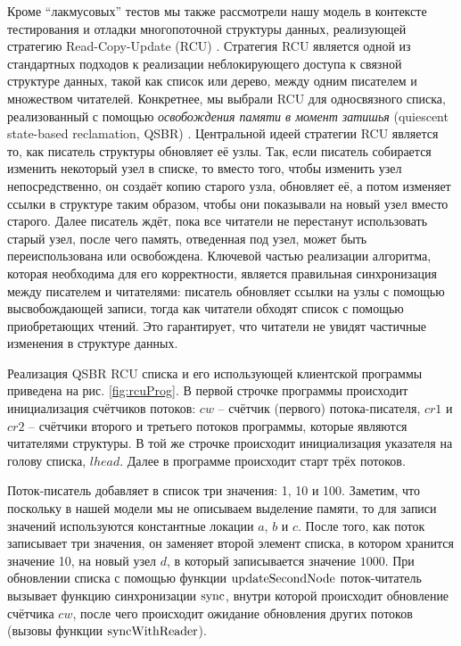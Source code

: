 Кроме ``лакмусовых'' тестов мы также рассмотрели нашу модель в контексте тестирования и отладки
многопоточной структуры данных, реализующей стратегию Read-Copy-Update (RCU) \cite{McKenney-Slingwine:PDCS98,McKenney:PhD}.
Стратегия RCU является одной из стандартных подходов к реализации неблокирующего доступа к
связной структуре данных, такой как список или дерево, между одним писателем и множеством читателей.
Конкретнее, мы выбрали RCU для односвязного списка, реализованный с помощью
\emph{освобождения памяти в момент затишья} (quiescent state-based reclamation, QSBR) \cite{Desnoyers-al:TPDS12}.
Центральной идеей стратегии RCU является то, как писатель структуры обновляет её узлы.
Так, если писатель собирается изменить некоторый узел в списке, то вместо того, чтобы
изменить узел непосредственно, он создаёт копию старого узла, обновляет её, а потом изменяет ссылки в структуре
таким образом, чтобы они показывали на новый узел вместо старого.
Далее писатель ждёт, пока все читатели не перестанут использовать старый узел, после чего
память, отведенная под узел, может быть переиспользована или освобождена.
Ключевой частью реализации алгоритма, которая необходима для его корректности, является
правильная синхронизация между писателем и читателями:
писатель обновляет ссылки на узлы с помощью высвобождающей записи,
тогда как читатели обходят список с помощью приобретающих чтений.
Это гарантирует, что читатели не увидят частичные изменения в структуре данных.

Реализация QSBR RCU списка и его использующей клиентской программы приведена на рис. \ref{fig:rcuProg}.
В первой строчке программы происходит инициализация счётчиков потоков:
$cw$ -- счётчик (первого) потока-писателя,
$cr1$ и $cr2$ -- счётчики второго и третьего потоков программы, которые являются читателями структуры.
В той же строчке происходит инициализация указателя на голову списка, $lhead$.
Далее в программе происходит старт трёх потоков.

Поток-писатель добавляет в список три значения: 1, 10 и 100.
Заметим, что поскольку в нашей модели мы
не описываем выделение памяти, то для записи значений используются константные локации $a$, $b$ и $c$.
После того, как поток записывает три значения, он заменяет второй элемент списка, в котором хранится значение 10,
на новый узел $d$, в который записывается значение $1000$.
При обновлении списка с помощью функции ${\rm updateSecondNode}$
поток-читатель вызывает функцию синхронизации ${\rm sync}$, внутри которой происходит обновление
счётчика $cw$, после чего происходит ожидание обновления других потоков (вызовы функции ${\rm syncWithReader}$).

